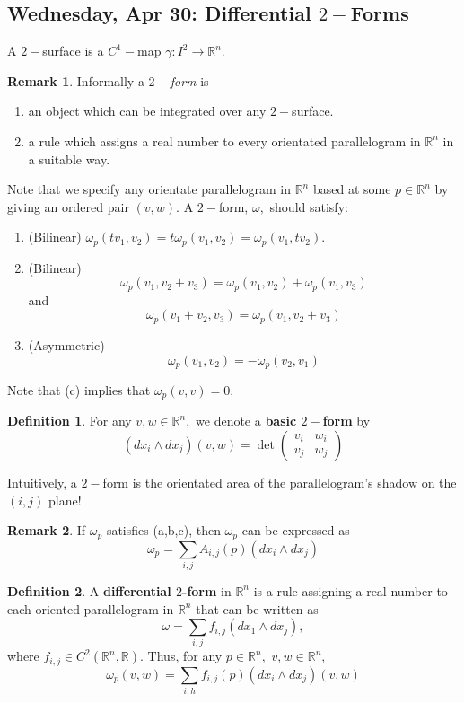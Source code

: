 \documentclass[10pt, oneside]{article}
\newcommand{\bbR}{\mathbb{R}}
\theoremstyle{definition}
\newtheorem{defn}{Definition}
\newtheorem{rem}{Remark}
\begin{document}
\subsection*{Wednesday, Apr 30: Differential $2-$Forms}
A $2-$surface is a $C^1-$map $\gamma: I^2 \to \bbR^n.$
\begin{rem}
    Informally a \textit{$2-$form} is
    \begin{enumerate}
        \item an object which can be integrated over any $2-$surface.
        \item a rule which assigns a real number to every orientated parallelogram in $\bbR^n$ in a suitable way. 
    \end{enumerate}
Note that we specify any orientate parallelogram in $\bbR^n$ based at some $p \in \bbR^n$ by giving an ordered pair $(v,w).$ A $2-$form, $\omega,$ should satisfy:
\begin{enumerate}
    \item (Bilinear) $\omega_p(tv_1, v_2) = t\omega_p(v_1, v_2) = \omega_p(v_1, tv_2).$
    \item (Bilinear) \[\omega_p(v_1, v_2 + v_3) = \omega_p(v_1, v_2) + \omega_p(v_1, v_3)\] and 
    \[\omega_p(v_1 + v_2, v_3) = \omega_p(v_1, v_2 + v_3)\]
    \item (Asymmetric)
    \[\omega_p(v_1, v_2) = -\omega_p(v_2, v_1)\]
\end{enumerate}
Note that (c) implies that $\omega_p(v,v) = 0.$
\end{rem}
\begin{defn}
    For any $v,w \in \bbR^n,$ we denote a \textbf{basic $2-$form} by 
    \[(dx_i \wedge dx_j)(v, w) = \det\begin{pmatrix}
        v_i & w_i\\
        v_j & w_j
    \end{pmatrix}\]
\end{defn}
Intuitively, a $2-$form is the orientated area of the parallelogram's shadow on the $(i,j)$ plane!
\begin{rem}
    If $\omega_p$ satisfies (a,b,c), then $\omega_p$ can be expressed as 
    \[\omega_p = \sum_{i,j}A_{i,j}(p)(dx_i \wedge dx_j)\]
\end{rem}

\begin{defn}
    A \textbf{differential $2$-form} in $\bbR^n$ is a rule assigning a real number to each oriented parallelogram in $\bbR^n$ that can be written as 
    \[\omega = \sum_{i,j}f_{i,j}(dx_1\wedge dx_j),\] where $f_{i,j} \in C^2(\bbR^n, \bbR).$ Thus, for any $p \in \bbR^n,$ $v,w \in \bbR^n,$
    \[\omega_p(v,w) = \sum_{i,h}f_{i,j}(p)(dx_i \wedge dx_j)(v,w)\]
\end{defn}
\end{document}
